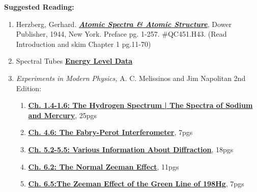 \documentclass{../lab}
\begin{document}
\noindent\textbf{Suggested Reading:}

\begin{enumerate}
    \item Herzberg, Gerhard. \emph{\href{http://physics111.lib.berkeley.edu/Physics111/Reprints/ATM/02-2ndEd-Atomic\_Spectra\_and\_Atomic\_Structure.pdf}{\textbf{Atomic Spectra \& Atomic Structure}}}, Dower Publisher, 1944, New York. Preface pg. 1-257. \#QC451.H43. (Read Introduction and skim Chapter 1 pg.11-70)

    \item Spectral Tubes \href{http://physics111.lib.berkeley.edu/Physics111/Reprints/ATM/ATM\_index.html}{\textbf{Energy Level Data}}

    \item\emph{Experiments in Modern Physics,} A. C. Melissinos and Jim Napolitan 2nd Edition:
    
    \begin{enumerate}
        \item \href{http://physics111.lib.berkeley.edu/Physics111/Reprints/ATM/Melissinos\_2nd\_2003/ATM\%20OCR\%20melissinos\%202003\%20chapter\%201.4-1.6.pdf}{\textbf{Ch. 1.4-1.6: The Hydrogen Spectrum | The Spectra of Sodium and Mercury}}, 25pgs
    
        \item \href{http://physics111.lib.berkeley.edu/Physics111/Reprints/ATM/Melissinos\_2nd\_2003/ATM\%20OCR\%20melissinos\%202003\%20chapter\%204.6.pdf}{\textbf{Ch. 4.6: The Fabry-Perot Interferometer}}, 7pgs
    
        \item \href{http://physics111.lib.berkeley.edu/Physics111/Reprints/ATM/Melissinos\_2nd\_2003/ATM\%20OCR\%20melissinos\%202003\%20chapter\%205.2-5.5.pdf}{\textbf{Ch. 5.2-5.5: Various Information About Diffraction}}, 18pgs
    
        \item \href{http://physics111.lib.berkeley.edu/Physics111/Reprints/ATM/Melissinos\_2nd\_2003/ATM\%20OCR\%20melissinos\%202003\%20chapter\%206.2.pdf}{\textbf{Ch. 6.2: The Normal Zeeman Effect}}, 11pgs
    
        \item \href{http://physics111.lib.berkeley.edu/Physics111/Reprints/ATM/Melissinos\_2nd\_2003/ATM\%20OCR\%20melissinos\%202003\%20chapter\%206.5.pdf}{\textbf{Ch. 6.5:The Zeeman Effect of the Green Line of 198Hg}}, 7pgs
    
    \end{enumerate}

\end{enumerate}
\end{document}
